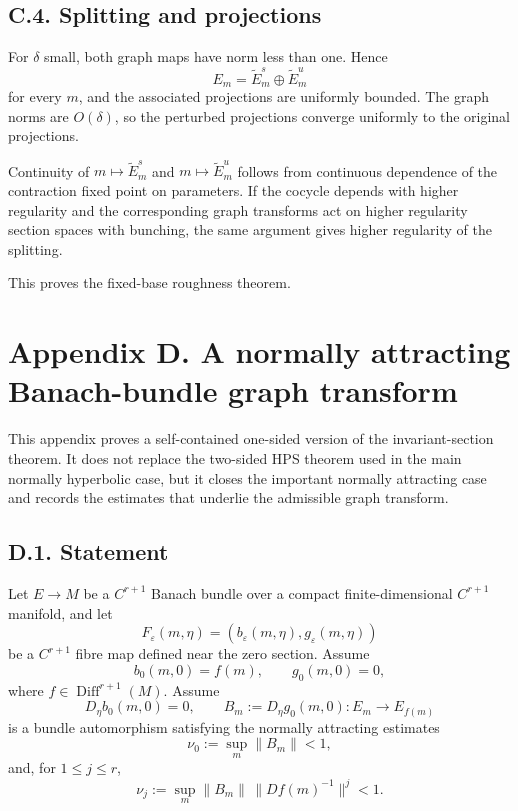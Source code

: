 \documentclass[12pt,a4paper]{article}
\theoremstyle{plain}
\numberwithin{equation}{section}
\numberwithin{theorem}{section}
\begin{document}
\subsection{C.4. Splitting and projections}

For $\delta$ small, both graph maps have norm less than one. Hence
\[
E_m=\widetilde E_m^s\oplus\widetilde E_m^u
\]
for every $m$, and the associated projections are uniformly bounded. The graph norms are $O(\delta)$, so the perturbed projections converge uniformly to the original projections.

Continuity of $m\mapsto \widetilde E_m^s$ and $m\mapsto \widetilde E_m^u$ follows from continuous dependence of the contraction fixed point on parameters. If the cocycle depends with higher regularity and the corresponding graph transforms act on higher regularity section spaces with bunching, the same argument gives higher regularity of the splitting.

This proves the fixed-base roughness theorem.

\clearpage

\section{Appendix D. A normally attracting Banach-bundle graph transform}

This appendix proves a self-contained one-sided version of the invariant-section theorem. It does not replace the two-sided HPS theorem used in the main normally hyperbolic case, but it closes the important normally attracting case and records the estimates that underlie the admissible graph transform.

\subsection{D.1. Statement}

Let $E\to M$ be a $C^{r+1}$ Banach bundle over a compact finite-dimensional $C^{r+1}$ manifold, and let
\[
F_\varepsilon(m,\eta)=(b_\varepsilon(m,\eta),g_\varepsilon(m,\eta))
\]
be a $C^{r+1}$ fibre map defined near the zero section. Assume
\[
b_0(m,0)=f(m),
\qquad
g_0(m,0)=0,
\]
where $f\in\operatorname{Diff}^{r+1}(M)$. Assume
\[
D_\eta b_0(m,0)=0,
\qquad
B_m:=D_\eta g_0(m,0):E_m\to E_{f(m)}
\]
is a bundle automorphism satisfying the normally attracting estimates
\[
\nu_0:=\sup_m\|B_m\|<1,
\]
and, for $1\le j\le r$,
\[
\nu_j:=\sup_m\|B_m\|\,\|Df(m)^{-1}\|^j<1.
\]
\end{document}
